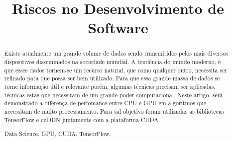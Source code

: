 \documentclass[conference]{IEEEtran}
\begin{document}
	\title{Riscos no Desenvolvimento de Software}
	
	\author{
		\and
		\and
		}
	
	\maketitle
	
	\begin{abstract}
		
		Existe atualmente um grande volume de dados sendo transmitidos pelos mais diversos dispositivos disseminados na sociedade mundial. A tendência do mundo moderno, é que esses dados tornem-se um recurso natural, que como qualquer outro, necessita ser refinado para que possa ser bem utilizado. Para que essa grande massa de dados se torne informação útil e relevante porém, algumas técnicas precisam ser aplicadas, técnicas estas que necessitam de um grande poder computacional. Neste artigo, será demonstrado a diferença de perfomance entre CPU e GPU em algoritmos que necessitam de muito processamento. Para tal objetivo foram utilizadas as bibliotecas TensorFlow e cuDDN juntamente com a plataforma CUDA. 
		
		\begin{IEEEkeywords} Data Science, GPU, CUDA, TensorFlow. \end{IEEEkeywords}
	\end{abstract}
	
\end{document}
